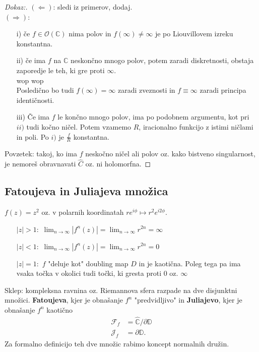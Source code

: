 \documentclass{article}
\newcommand{\C}{\mathbb{C}}
\newcommand{\D}{\mathbb{D}}
\newcommand{\Ho}{\mathcal{O}}
\begin{document}
\begin{proof}[Dokaz:]
$(\Longleftarrow)$: sledi iz primerov, dodaj.\\ 
$(\Longrightarrow)$: 
\begin{enumerate}
\item[i)] če $f\in \Ho(\C)$ nima polov in $f(\infty) \neq \infty$ je po Liouvillovem izreku konstantna.
\item[ii)] če ima $f$ na $\C$ neskončno mnogo polov, potem zaradi diskretnosti, obstaja zaporedje le teh, ki gre proti $\infty$.\\ 
wop wop\\ 
Posledično bo tudi $f(\infty) = \infty$ zaradi zveznosti in $f \equiv \infty$ zaradi principa identičnosti.
\item[iii)] Če ima $f$ le končno mnogo polov, ima po podobnem argumentu, kot pri $ii)$ tudi kočno ničel. Potem vzamemo $R$, iracionalno funkcijo z istimi ničlami in poli. Po $i)$ je $\frac{f}{R}$ konstantna.
\end{enumerate}
Povzetek: takoj, ko ima $f$ neskočno ničel ali polov oz. kako bistveno singularnost, je nemoreš obravnavati $\hat{C}$ oz. ni holomorfna.
\end{proof}

\subsection{Fatoujeva in Juliajeva množica}

$f(z) = z^2$ oz. v polarnih koordinatah $re^{i\phi} \mapsto r^2 e^{i2\phi}$.
\begin{enumerate}
\item[$|z| > 1:$] $\lim_{n\rightarrow \infty} |f^n(z)| = \lim_{n\rightarrow \infty} r^{2n} = \infty$
\item[$|z| < 1:$] $\lim_{n\rightarrow \infty} |f^n(z)| = \lim_{n\rightarrow \infty} r^{2n} = 0$
\item[$|z| = 1:$] $f$ "deluje kot" doubling map $D$ in je kaotična. Poleg tega pa ima vsaka točka v okolici tudi točki, ki gresta proti $0$ oz. $\infty$
\end{enumerate}

Sklep: kompleksna ravnina oz. Riemannova sfera razpade na dve disjunktni množici. \textbf{Fatoujeva}, kjer je obnašanje $f^n$ "predvidljivo" in \textbf{Juliajevo}, kjer je obnašanje $f^n$ kaotično 
\begin{align*}
\mathcal{F}_f &= \hat{\C} \slash \partial \D \\ 
\mathcal{J}_f &= \partial \D.
\end{align*}
Za formalno definicijo teh dve množic rabimo koncept normalnih družin.
\end{document}
